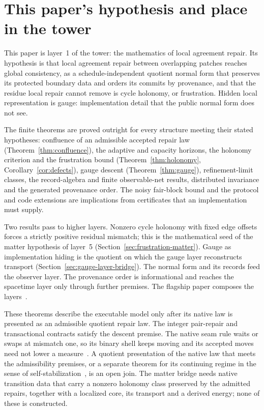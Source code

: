 \documentclass[11pt]{article}
\theoremstyle{remark}
\theoremstyle{plain}
\begin{document}
\section*{This paper's hypothesis and place in the tower}

This paper is layer~1 of the tower: the mathematics of local agreement
repair. Its hypothesis is that local agreement repair between overlapping
patches reaches global consistency, as a schedule-independent quotient
normal form that preserves its protected boundary data and orders its
commits by provenance, and that the residue local repair cannot remove is
cycle holonomy, or frustration. Hidden local representation is gauge:
implementation detail that the public normal form does not see.

The finite theorems are proved outright for every structure meeting their
stated hypotheses:
confluence of an admissible accepted repair law
(Theorem~\ref{thm:confluence}), the adaptive and capacity horizons, the
holonomy criterion and the frustration bound (Theorem~\ref{thm:holonomy},
Corollary~\ref{cor:defects}), gauge descent (Theorem~\ref{thm:gauge}),
refinement-limit classes, the record-algebra and finite observable-net
results, distributed invariance and the generated provenance order. The
noisy fair-block bound and the protocol and code extensions are
implications from certificates that an implementation must supply.

Two results pass to higher layers. Nonzero cycle holonomy with fixed edge
offsets forces a strictly positive residual mismatch; this is the
mathematical seed of the matter hypothesis of layer~5
(Section~\ref{sec:frustration-matter}). Gauge as implementation hiding is
the quotient on which the gauge layer reconstructs transport
(Section~\ref{sec:gauge-layer-bridge}). The normal form and its records feed
the observer layer. The provenance order is informational and reaches the
spacetime layer only through further premises. The flagship paper composes
the layers~\cite{ophsynthesis}.

These theorems describe the executable model only after its native law is
presented as an admissible quotient repair law. The integer pair-repair and
transactional contracts satisfy the descent premise. The native seam rule
waits or swaps at mismatch one, so its binary shell keeps moving and its
accepted moves need not lower a measure~\cite{ophmodelguide}. A quotient
presentation of the native law that meets the admissibility premises, or a
separate theorem for its continuing regime in the sense of
self-stabilization~\cite{dijkstra1974}, is an open join. The matter bridge needs native transition data
that carry a nonzero holonomy class preserved by the admitted repairs,
together with a localized core, its transport and a derived energy; none of
these is constructed.
\end{document}
